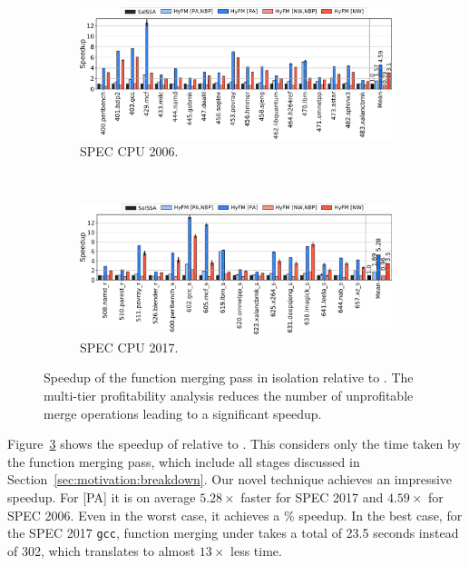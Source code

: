  \begin{figure}[h]
   \centering
 \begin{subfigure}{\textwidth}
 \center
   \includegraphics[width=\textwidth]{src/lctes21/figs/speedup-spec06.pdf}
 \caption{SPEC CPU 2006.}
 \label{fig:speedup-spec06}
 \end{subfigure}
 \\
 \begin{subfigure}{\textwidth}
 \center
   \includegraphics[width=\textwidth]{src/lctes21/figs/speedup-spec17.pdf}
 \caption{SPEC CPU 2017.}
 \label{fig:speedup-spec17}
 \end{subfigure}
 \caption{Speedup of the function merging pass in isolation relative to {\SOAName}. The multi-tier profitability analysis reduces the number of unprofitable merge operations leading to a significant speedup.}
  \label{fig:speedup-both}
 \end{figure}


Figure~\ref{fig:speedup-both} shows the speedup of {\ProjName} relative to {\SOAName}.
This considers only the time taken by the function merging pass, which include all stages discussed in Section~\ref{sec:motivation:breakdown}.
Our novel technique achieves an impressive speedup. For {[PA]} it is on average $5.28\times$ faster for SPEC 2017 and $4.59\times$ for SPEC 2006. Even in the worst case, it achieves a \% speedup. In the best case, for the SPEC 2017 \texttt{gcc}, function merging under {\ProjName} takes a total of 23.5 seconds instead of 302, which translates to almost $13\times$ less time.

